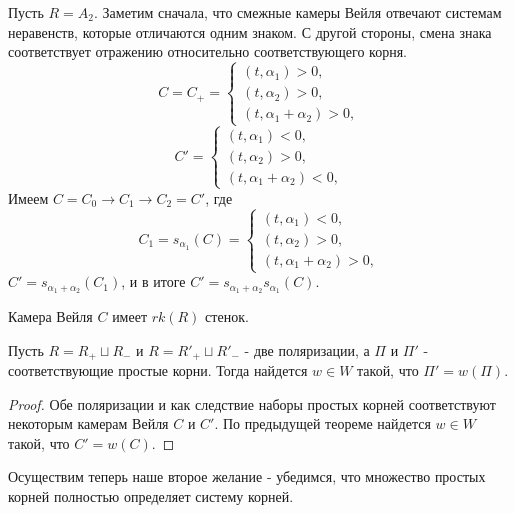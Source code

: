 \documentclass[a4article]{article}
\begin{document}
\begin{example}
    Пусть $R=A_2$. Заметим сначала, что смежные камеры Вейля отвечают системам неравенств, которые отличаются одним знаком. С другой стороны, смена знака соответствует отражению относительно соответствующего корня.
    \begin{equation}
        C=C_{+}=\begin{cases}
            (t, \alpha_1) > 0,\\
            (t, \alpha_2) > 0,\\
            (t, \alpha_1+\alpha_2) > 0,
        \end{cases}
    \end{equation}
    \begin{equation}
        C'=\begin{cases}
            (t, \alpha_1) < 0,\\
            (t, \alpha_2) > 0,\\
            (t, \alpha_1+\alpha_2) < 0,
        \end{cases}
    \end{equation}
    Имеем $C=C_0 \rightarrow C_1 \rightarrow C_2 = C'$, где
    \begin{equation}
        C_1=s_{\alpha_1}(C)=\begin{cases}
            (t, \alpha_1) < 0,\\
            (t, \alpha_2) > 0,\\
            (t, \alpha_1+\alpha_2) > 0,
        \end{cases}
    \end{equation}
    $C' = s_{\alpha_1 + \alpha_2}(C_1)$, и в итоге
    $C' = s_{\alpha_1 + \alpha_2}s_{\alpha_1}(C)$.
\end{example}
\begin{corollary}
    Камера Вейля $C$ имеет $rk(R)$ стенок.
\end{corollary}
\begin{corollary}
    Пусть $R=R_{+}\sqcup R_{-}$ и $R=R'_{+}\sqcup R'_{-}$ - две поляризации, а $\Pi$ и $\Pi'$ - соответствующие простые корни. Тогда найдется $w \in W$ такой, что $\Pi' = w(\Pi)$.
\end{corollary}
\begin{proof}
    Обе поляризации и как следствие наборы простых корней соответствуют некоторым камерам Вейля $C$ и $C'$. По предыдущей теореме найдется $w \in W$ такой, что $C' = w(C)$.
\end{proof}
Осуществим теперь наше второе желание - убедимся, что множество простых корней полностью определяет систему корней.
\end{document}
